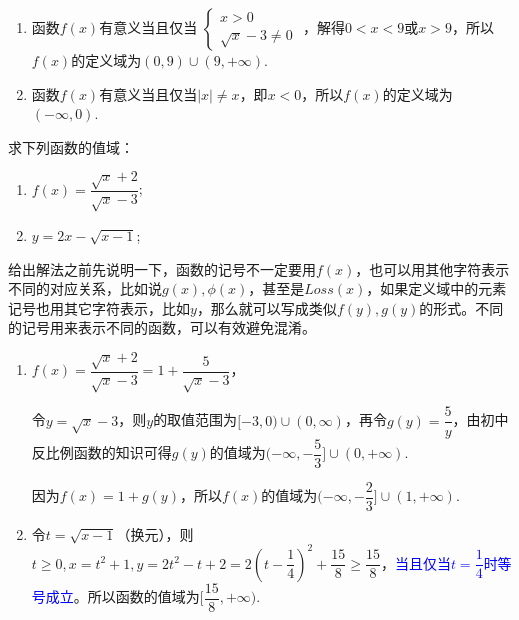 \documentclass[lang=cn,math=cm,chinesefont=nofont,11pt,scheme=chinese,twocol]{elegantbook}
\begin{document}
\begin{solution}
  \begin{enumerate}
    \item 函数$f(x)$有意义当且仅当
     $\begin{cases}
        x>0
        \\\sqrt{x}-3\neq 0
      \end{cases}$
    ，解得$0<x<9$或$x>9$，所以$f(x)$的定义域为$(0,9)\cup (9,+\infty)$.

    \item 函数$f(x)$有意义当且仅当$\left| x \right|\neq x$，即$x<0$，所以$f(x)$的定义域为$(-\infty,0).$
  \end{enumerate}
\end{solution}

\begin{spacing}{2.0}
  \begin{example}
    求下列函数的值域：
  \end{example}
  
  \begin{enumerate}
    \item $f(x)=\dfrac{\sqrt{x}+2}{\sqrt{x}-3}$;
    \item $y=2x-\sqrt{x-1}$;
  \end{enumerate}
\end{spacing}

给出解法之前先说明一下，函数的记号不一定要用$f(x)$，也可以用其他字符表示不同的对应关系，比如说$g(x),\phi (x)$，甚至是$Loss(x)$，如果定义域中的元素记号也用其它字符表示，比如$y$，那么就可以写成类似$f(y),g(y)$的形式。不同的记号用来表示不同的函数，可以有效避免混淆。

\begin{solution}
  \begin{enumerate}
    \item $f(x)=\dfrac{\sqrt{x}+2}{\sqrt{x}-3}=1+\dfrac{5}{\sqrt{x}-3}$，
    
    令$y=\sqrt{x}-3$，则$y$的取值范围为$[-3,0)\cup (0,\infty)$，再令$g(y)=\dfrac{5}{y}$，由初中反比例函数的知识可得$g(y)$的值域为$(-\infty,-\dfrac{5}{3}]\cup (0,+\infty)$.

    因为$f(x)=1+g(y)$，所以$f(x)$的值域为$(-\infty,-\dfrac{2}{3}]\cup (1,+\infty)$.

    \item 令$t=\sqrt{x-1}$（换元），则$t\geqslant 0,x=t^2+1,y=2t^2-t+2=2(t-\dfrac{1}{4})^2+\dfrac{15}{8}\geqslant\dfrac{15}{8}$，\textcolor{blue}{当且仅当$t=\dfrac{1}{4}$时等号成立}。所以函数的值域为$[\dfrac{15}{8},+\infty).$
  \end{enumerate}
\end{solution}
\end{document}
